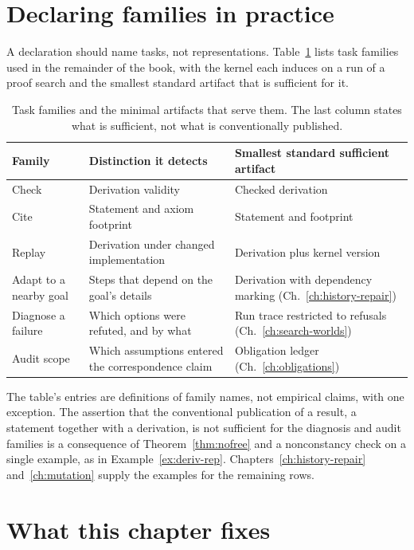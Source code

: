 \section{Declaring families in practice}

A declaration should name tasks, not representations. Table~\ref{tab:families} lists task families used in the remainder of the book, with the kernel each induces on a run of a proof search and the smallest standard artifact that is sufficient for it.

\begin{table}[ht]
\centering
\small
\begin{tabular}{@{}p{3.4cm}p{4.6cm}p{4.2cm}@{}}
\toprule
Family & Distinction it detects & Smallest standard sufficient artifact\\
\midrule
Check & Derivation validity & Checked derivation\\
Cite & Statement and axiom footprint & Statement and footprint\\
Replay & Derivation under changed implementation & Derivation plus kernel version\\
Adapt to a nearby goal & Steps that depend on the goal's details & Derivation with dependency marking (Ch.~\ref{ch:history-repair})\\
Diagnose a failure & Which options were refuted, and by what & Run trace restricted to refusals (Ch.~\ref{ch:search-worlds})\\
Audit scope & Which assumptions entered the correspondence claim & Obligation ledger (Ch.~\ref{ch:obligations})\\
\bottomrule
\end{tabular}
\caption{Task families and the minimal artifacts that serve them. The last column states what is sufficient, not what is conventionally published.}
\label{tab:families}
\end{table}

The table's entries are definitions of family names, not empirical claims, with one exception. The assertion that the conventional publication of a result, a statement together with a derivation, is not sufficient for the diagnosis and audit families is a consequence of Theorem~\ref{thm:nofree} and a nonconstancy check on a single example, as in Example~\ref{ex:deriv-rep}. Chapters~\ref{ch:history-repair} and~\ref{ch:mutation} supply the examples for the remaining rows.

\section{What this chapter fixes}

